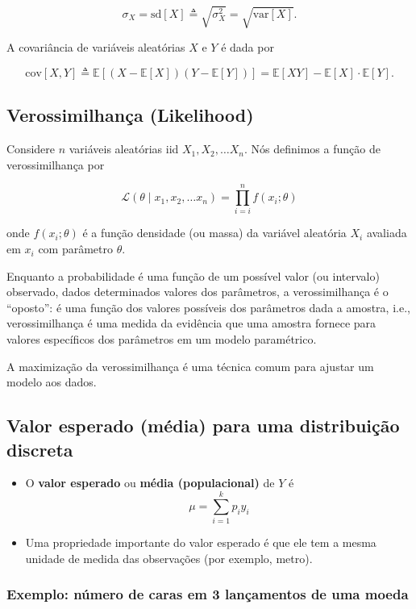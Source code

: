 \documentclass[]{article}
\providecommand{\tightlist}{%
  \setlength{\itemsep}{0pt}\setlength{\parskip}{0pt}}
\begin{document}
\[ \sigma_{X} = \text{sd}[X] \triangleq \sqrt{\sigma^2_{X}} = \sqrt{\text{var}[X]}. \]

A covariância de variáveis aleatórias \(X\) e \(Y\) é dada por

\[ \text{cov}[X, Y] \triangleq \mathbb{E}[(X - \mathbb{E}[X])(Y - \mathbb{E}[Y])] = \mathbb{E}[XY] - \mathbb{E}[X] \cdot \mathbb{E}[Y]. \]

\subsection{Verossimilhança
(Likelihood)}\label{verossimilhanca-likelihood}

Considere \(n\) variáveis aleatórias iid \(X_1, X_2, \ldots X_n\). Nós
definimos a função de verossimilhança por

\[ \mathcal{L}(\theta \mid x_1, x_2, \ldots x_n) = \prod_{i = i}^n f(x_i; \theta) \]

onde \(f(x_i; \theta)\) é a função densidade (ou massa) da variável
aleatória \(X_i\) avaliada em \(x_i\) com parâmetro \(\theta\).

Enquanto a probabilidade é uma função de um possível valor (ou
intervalo) observado, dados determinados valores dos parâmetros, a
verossimilhança é o ``oposto'': é uma função dos valores possíveis dos
parâmetros dada a amostra, i.e., verossimilhança é uma medida da
evidência que uma amostra fornece para valores específicos dos
parâmetros em um modelo paramétrico.

A maximização da verossimilhança é uma técnica comum para ajustar um
modelo aos dados.

\subsection{Valor esperado (média) para uma distribuição
discreta}\label{valor-esperado-media-para-uma-distribuicao-discreta}

\begin{itemize}
\tightlist
\item
  O \textbf{valor esperado} ou \textbf{média (populacional)} de \(Y\) é
  \[
    \mu = \sum_{i=1}^k p_iy_i
    \]
\item
  Uma propriedade importante do valor esperado é que ele tem a mesma
  unidade de medida das observações (por exemplo, metro).
\end{itemize}

\subsubsection{Exemplo: número de caras em 3 lançamentos de uma
moeda}\label{exemplo-numero-de-caras-em-3-lancamentos-de-uma-moeda}
\end{document}
